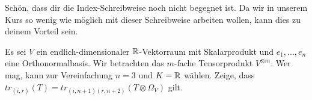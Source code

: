\begin{sheet}
\begin{problem}[title={Was denn für Indizes?}]
	Schön, dass dir die Index-Schreibweise noch nicht begegnet ist. Da wir in unserem Kurs so wenig wie möglich mit dieser Schreibweise arbeiten wollen, kann dies zu deinem Vorteil sein.

	Es sei $V$ ein endlich-dimensionaler $\mathbb{R}$-Vektorraum mit Skalarprodukt und $e_1, ..., e_n$ eine Orthonormalbasis. Wir betrachten das $m$-fache Tensorprodukt $V^{\otimes m}$. Wer mag, kann zur Vereinfachung $n=3$ und $K=\mathbb{R}$ wählen. Zeige, dass $tr_{(i,r)}(T)=tr_{(i,n+1)(r,n+2)}(T\otimes \Omega_V)$ gilt.

\end{problem}

\end{sheet}